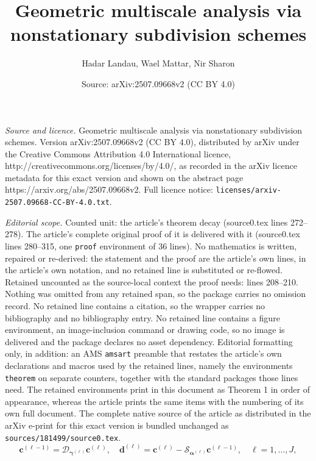 \documentclass[10pt,a4paper]{amsart}
\title{Geometric multiscale analysis via nonstationary subdivision schemes}
\author{Hadar Landau, Wael Mattar, Nir Sharon}
\date{Source: arXiv:2507.09668v2 (CC BY 4.0)}
\begin{document}
\maketitle

\noindent\emph{Source and licence.} Geometric multiscale analysis via nonstationary subdivision schemes. Version arXiv:2507.09668v2 (CC BY 4.0), distributed by arXiv under the Creative Commons Attribution 4.0 International licence, http://creativecommons.org/licenses/by/4.0/, as recorded in the arXiv licence metadata for this exact version and shown on the abstract page https://arxiv.org/abs/2507.09668v2. Full licence notice: \texttt{licenses/arxiv-2507.09668-CC-BY-4.0.txt}.\par\smallskip

\noindent\textit{Editorial scope.} Counted unit: the article's theorem decay (source0.tex lines 272--278). The article's complete original proof of it is delivered with it (source0.tex lines 280--315, one \texttt{proof} environment of 36 lines). No mathematics is written, repaired or re-derived: the statement and the proof are the article's own lines, in the article's own notation, and no retained line is substituted or re-flowed.  Retained uncounted as the source-local context the proof needs: lines 208--210.  Nothing was omitted from any retained span, so the package carries no omission record.  No retained line contains a citation, so the wrapper carries no bibliography and no bibliography entry.  No retained line contains a figure environment, an image-inclusion command or drawing code, so no image is delivered and the package declares no asset dependency.  Editorial formatting only, in addition: an AMS \texttt{amsart} preamble that restates the article's own declarations and macros used by the retained lines, namely the environments \texttt{theorem} on separate counters, together with the standard packages those lines need.  The retained environments print in this document as Theorem 1 in order of appearance, whereas the article prints the same items with the numbering of its own full document.  The complete native source of the article as distributed in the arXiv e-print for this exact version is bundled unchanged as \texttt{sources/181499/source0.tex}.
\begin{equation} \label{NS multiscale transform}
    \boldsymbol{c}^{(\ell-1)}=\mathcal{D}_{\boldsymbol{\gamma}^{(\ell)}}\boldsymbol{c}^{(\ell)}, \quad \boldsymbol{d}^{(\ell)}=\boldsymbol{c}^{(\ell)}-\mathcal{S}_{\boldsymbol{\alpha}^{(\ell)}}\boldsymbol{c}^{(\ell-1)}, \quad \ell=1,\dots,J,
\end{equation}
\end{document}
